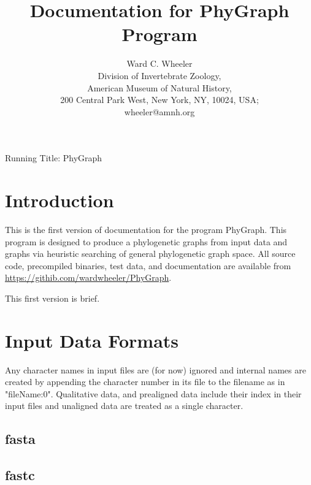 \documentclass[11pt]{memoir}
\begin{document}
	
	\title{Documentation for PhyGraph Program}
	\author{Ward C. Wheeler\\
		Division of Invertebrate Zoology,\\ American Museum of Natural History,\\ 200 Central Park West, New York, NY, 10024, USA;\\wheeler@amnh.org}
	
	
	\maketitle
	\begin{center}
		Running Title: PhyGraph
	\end{center}
	\newpage
	
	
	\section{Introduction}
	This is the first version of documentation for the program PhyGraph.  This program is designed to produce a phylogenetic graphs from input data and graphs via heuristic searching of general phylogenetic graph space.
	All source code, precompiled binaries, test data, and documentation are available from \url{https://githib.com/wardwheeler/PhyGraph}.
	
	This first version is brief.
	
	\section{Input Data Formats}
		Any character names in input files are (for now) ignored and internal names are created
		by appending the character number in its file to the filename as in "fileName:0".
		Qualitative data, and prealigned data include their index in their input files and unaligned 
		data are treated as a single character.
		\subsection{fasta}
		\subsection{fastc}
\end{document}
